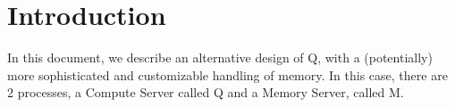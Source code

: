 
\section{Introduction}
In this document, we describe an alternative design of Q, with a (potentially)
more sophisticated and customizable handling of memory. In this case, there are
2 processes, a Compute Server called Q and a Memory Server, called M.
